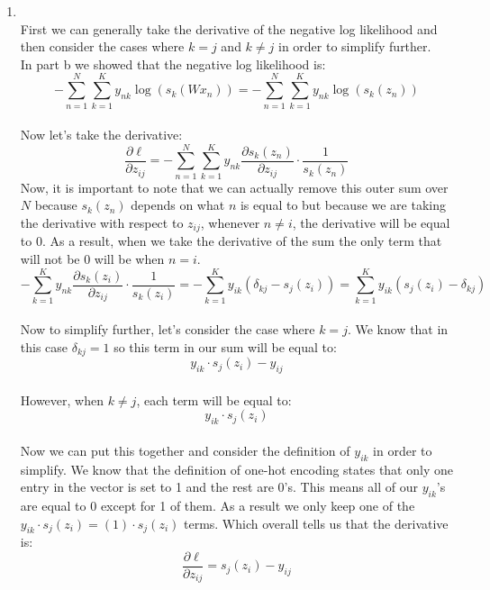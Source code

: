 \documentclass[submit]{harvardml}
\begin{document}
\begin{enumerate}
    \item\\
    First we can generally take the derivative of the negative log likelihood and then consider the cases where $k=j$ and $k\neq j$ in order to simplify further.\\
    In part b we showed that the negative log likelihood is:\\
    $$-\sum_{n=1}^N\sum_{k=1}^Ky_{nk}\log(s_k(Wx_n)) = -\sum_{n=1}^N\sum_{k=1}^Ky_{nk}\log(s_k(z_n))$$\\
    Now let's take the derivative:\\
    $$\frac{\partial \ell}{\partial z_{ij}} = -\sum_{n=1}^N\sum_{k=1}^Ky_{nk}\frac{\partial s_k(z_n)}{\partial z_{ij}}\cdot \frac{1}{s_k(z_n)}$$
    Now, it is important to note that we can actually remove this outer sum over $N$ because $s_k(z_n)$ depends on what $n$ is equal to but because we are taking the derivative with respect to $z_{ij}$, whenever $n\neq i$, the derivative will be equal to 0. As a result, when we take the derivative of the sum the only term that will not be 0 will be when $n=i$. \\
    $$-\sum_{k=1}^Ky_{nk}\frac{\partial s_k(z_i)}{\partial z_{ij}}\cdot \frac{1}{s_k(z_i)} = -\sum_{k=1}^Ky_{ik}(\delta_{kj} - s_j(z_i))=  \sum_{k=1}^Ky_{ik}(s_j(z_i) - \delta_{kj})$$\\
    Now to simplify further, let's consider the case where $k=j$. We know that in this case $\delta_{kj} = 1$ so this term in our sum will be equal to:
    $$y_{ik}\cdot s_j(z_i) - y_{ij}$$\\
    However, when $k\neq j$, each term will be equal to:\\
    $$y_{ik}\cdot s_j(z_i)$$\\
    Now we can put this together and consider the definition of $y_{ik}$ in order to simplify. We know that the definition of one-hot encoding states that only one entry in the vector is set to 1 and the rest are 0's. This means all of our $y_{ik}$'s are equal to 0 except for 1 of them. As a result we only keep one of the $y_{ik}\cdot s_j(z_i) = (1)\cdot s_j(z_i)$ terms. Which overall tells us that the derivative is:\\
    $$\boxed{\frac{\partial \ell}{\partial z_{ij}} = s_j(z_i)-y_{ij}}$$\\
    

\end{enumerate}
\end{document}
